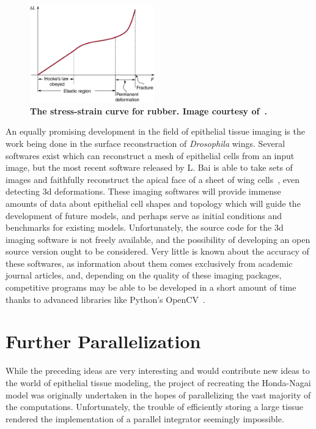\begin{figure}
  \begin{center}
    \includegraphics[width=0.48\textwidth]{../diagrams/rubber.jpeg}
  \end{center}
  \caption{\textbf{The stress-strain curve for rubber. Image courtesy of~\cite{rubr}.}}
\label{fig:rubber}
\end{figure}

An equally promising development in the field of epithelial tissue imaging is the work being done in the surface reconstruction of \emph{Drosophila} wings. Several softwares exist which can reconstruct a mesh of epithelial cells from an input image, but the most recent software released by L. Bai is able to take sets of images and faithfully reconstruct the apical face of a sheet of wing cells~\cite{3dwing}, even detecting 3d deformations. These imaging softwares will provide immense amounts of data about epithelial cell shapes and topology which will guide the development of future models, and perhaps serve as initial conditions and benchmarks for existing models. Unfortunately, the source code for the 3d imaging software is not freely available, and the possibility of developing an open source version ought to be considered. Very little is known about the accuracy of these softwares, as information about them comes exclusively from academic journal articles, and, depending on the quality of these imaging packages, competitive programs may be able to be developed in a short amount of time thanks to advanced libraries like Python's OpenCV~\cite{OpenCV}.

\section{Further Parallelization}
While the preceding ideas are very interesting and would contribute new ideas to the world of epithelial tissue modeling, the project of recreating the Honda-Nagai model was originally undertaken in the hopes of parallelizing the vast majority of the computations. Unfortunately, the trouble of efficiently storing a large tissue rendered the implementation of a parallel integrator seemingly impossible. 

